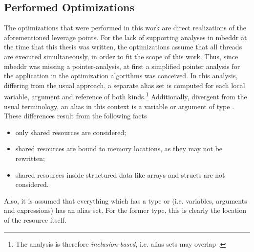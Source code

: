 \subsection{Performed Optimizations}
The optimizations that were performed in this work are direct realizations of the aforementioned leverage points. For the lack of supporting analyses in mbeddr at the time that this thesis was written, the optimizations assume that all threads are executed simultaneously, in order to fit the scope of this work. Thus, since mbeddr was missing a pointer-analysis, at first a simplified pointer analysis for the application in the optimization algorithms was conceived. In this analysis, differing from the usual approach, a separate alias set is computed for each local variable, argument and reference of both kinds.\footnote{The analysis is therefore \textit{inclusion-based}, i.e. alias sets may overlap \cite{CloningBasedContextSensitive}.} Additionally, divergent from the usual terminology, an alias in this context is a variable or argument of type . These differences result from the following facts
\begin{itemize}
\item only shared resources are considered;
\item shared resources are bound to memory locations, as they may not be rewritten;
\item shared resources inside structured data like arrays and structs are not considered.
\end{itemize}

Also, it is assumed that everything which has a type  or  (i.e. variables, arguments and expressions) has an alias set. For the former type, this is clearly the location of the resource itself.

